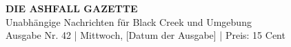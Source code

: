 \documentclass[10pt, a4paper]{article}
\begin{document}
\frenchspacing %

\begin{center}
    \vspace*{-2em} %
    \Huge \textbf{DIE ASHFALL GAZETTE} \\
    \large Unabhängige Nachrichten für Black Creek und Umgebung \\
    \normalsize Ausgabe Nr. 42 \quad | \quad Mittwoch, [Datum der Ausgabe] \quad | \quad Preis: 15 Cent
\end{center}
\hrulefill %
\end{document}
